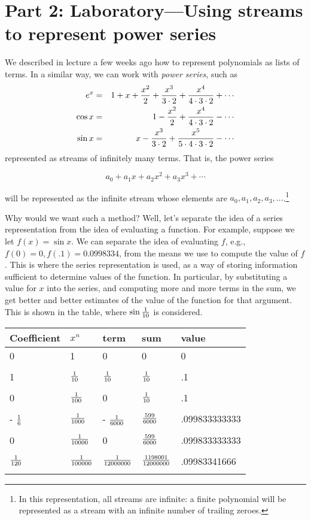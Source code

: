 \section{Part 2: Laboratory---Using streams to represent power series}

We described in lecture a few weeks ago how to represent polynomials
as lists of terms.  In a similar way, we can work with {\it power
series}, such as
\begin{eqnarray*}
e^{x} &=&
1+x+\frac{x^{2}}{2}+\frac{x^{3}}{3\cdot2}+\frac{x^{4}}{4\cdot 3\cdot
2}+\cdots \cr
\cos x &=& 1-\frac{x^{2}}{2}+\frac{x^{4}}{4\cdot 3\cdot 2}-\cdots \cr
\sin x &=& x-\frac{x^{3}}{3\cdot 2}+\frac{x^{5}}{5\cdot 4\cdot 3\cdot 2}- \cdots
\end{eqnarray*}
represented as streams of infinitely many terms.  That is, the power
series

\[ a_0 + a_1 x + a_2 x^2 + a_3 x^3 + \cdots \]

\noindent
will be represented as the infinite stream whose elements are $a_0,
a_1, a_2, a_3, \ldots$.\footnote{In this representation, all streams are
infinite: a finite polynomial will be represented as a stream with an
infinite number of trailing zeroes.}

Why would we want such a method?  Well, let's separate the idea of a
series representation from the idea of evaluating a function.  For
example, suppose we let $f(x) = \sin x$.  We can separate the idea of
evaluating $f$, e.g., $f(0) = 0, f(.1) = 0.0998334$, from the means we
use to compute the value of $f$.  This is where the series
representation is used, as a way of storing information sufficient to
determine values of the function.  In particular, by substituting a
value for $x$ into the series, and computing more and more terms in
the sum, we get better and better estimates of the value of the
function for that argument.  This is shown in the table, where $\sin
{1 \over 10}$ is considered.

\begin{tabular}{lllll}
Coefficient&$x^n$&term&sum&value\\
\hline
0& 1& 0 & 0& 0\\
\\
1& ${1 \over 10}$& ${1 \over 10}$ & ${1 \over 10}$& .1\\
\\
0&${  1 \over 100}$& 0 &  ${1 \over 10}$& .1\\
\\
- ${1 \over 6}$& ${1 \over 1000}$& - ${1 \over 6000}$ & ${599 \over 6000}$& .099833333333\\
\\
0& ${1 \over 10000}$& 0 & ${599 \over 6000}$& .099833333333\\
\\
${1 \over 120}$& ${1 \over 100000}$& ${1 \over 12000000}$ & ${1198001 \over
12000000}$& .09983341666\\
\\
\end{tabular}

